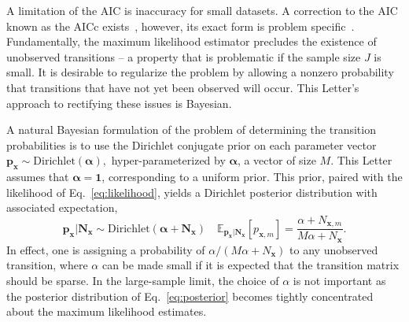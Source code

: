 \documentclass[prl,twocolumn,groupedaddress]{revtex4-1}
\newcommand{\bN}{\mathbf{N}}
\newcommand{\bx}{\mathbf{x}}
\newcommand{\bp}{\mathbf{p}}
\begin{document}
A limitation of the AIC is inaccuracy for small datasets. A correction to the AIC known as the AICc exists~\cite{hurvich1989regression}, however, its exact form is problem specific~\cite{burnham2003model}. Fundamentally, the maximum likelihood estimator precludes the existence of unobserved transitions -- a property that is problematic if  the sample size $J$ is small.
It is desirable to regularize the problem by allowing a nonzero probability that
transitions that have not yet been observed will occur. This Letter's approach to rectifying these issues is Bayesian.


A natural Bayesian formulation of the
problem of determining the transition probabilities is to use the Dirichlet conjugate prior
on each parameter vector
$
\mathbf{p}_{\bx} \sim \mathrm{Dirichlet}(\boldsymbol\alpha),
$
 hyper-parameterized by $\boldsymbol\alpha$, a vector of size $M$. This Letter assumes that $\boldsymbol\alpha=\mathbf{1}$, corresponding to a uniform prior. This prior, paired with the likelihood of Eq.~\ref{eq:likelihood}, %
yields a  Dirichlet posterior distribution with associated expectation,
\begin{equation}
\mathbf{p}_{\bx}  \vert \mathbf{N}_{\bx} \sim \mathrm{Dirichlet}(\boldsymbol\alpha + \mathbf{N}_{\bx} ) \quad \mathbb{E}_{\bp_\bx\vert\bN_\bx} [p_{\bx,m}] = \frac{\alpha + N_{\bx,m}}{M\alpha+ N_{\bx}}.\label{eq:posterior}
\end{equation}
In effect, one is assigning a probability of $\alpha/(M\alpha+N_{\bx})$ to any unobserved transition, where $\alpha$ can be made small if it is expected that the transition matrix should be sparse.   In the large-sample limit, the choice of $\alpha$ is not important as the posterior distribution of Eq.~\ref{eq:posterior}  becomes tightly concentrated about the maximum likelihood estimates.
\end{document}
